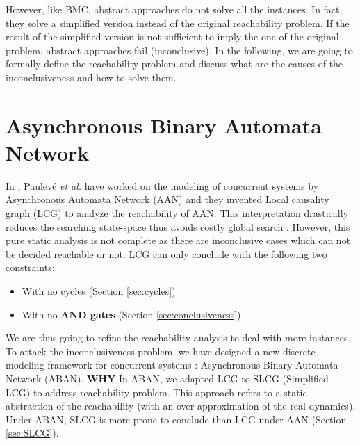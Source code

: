 However, like BMC, abstract approaches do not solve all the instances.
In fact, they solve a simplified version instead of the original reachability problem.
If the result of the simplified version is not sufficient to imply the one of the original problem, abstract approaches fail (inconclusive).
In the following, we are going to formally define the reachability problem and discuss what are the causes of the inconclusiveness and how to solve them. 

\section{Asynchronous Binary Automata Network}
In \cite{folschette2015}, Paulev\'e \textit{et al.} have worked on the modeling of concurrent systems by Asynchronous Automata Network (AAN) and they invented Local causality graph (LCG) \cite{pauleve2017reduction,folschette2015,pauleve2011} to analyze the reachability of AAN.
This interpretation drastically reduces the searching state-space thus avoids costly global search \cite{pauleve2012}. 
However, this pure static analysis is not complete as there are inconclusive cases which can not be decided reachable or not.
LCG can only conclude with the following two constraints:

\begin{itemize}
    \item With no cycles (Section \ref{sec:cycles})
    \item With no \textbf{AND gates} (Section \ref{sec:conclusiveness})
\end{itemize}

We are thus going to refine the reachability analysis to deal with more instances.
To attack the inconclusiveness problem, we have designed a new discrete modeling framework for concurrent systems \cite{chai2018heuristic}: Asynchronous Binary Automata Network (ABAN).
\textbf{WHY} In ABAN, we adapted LCG to SLCG (Simplified LCG) to address reachability problem.
This approach refers to a static abstraction of the reachability (with an over-approximation of the real dynamics).
Under ABAN, SLCG is more prone to conclude than LCG under AAN (Section \ref{sec:SLCG}).


